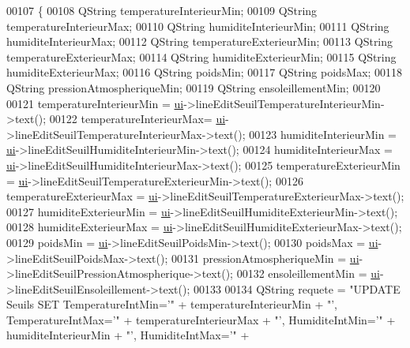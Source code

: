 \begin{DoxyCode}
00107 \{
00108     QString temperatureInterieurMin;
00109     QString temperatureInterieurMax;
00110     QString humiditeInterieurMin;
00111     QString humiditeInterieurMax;
00112     QString temperatureExterieurMin;
00113     QString temperatureExterieurMax;
00114     QString humiditeExterieurMin;
00115     QString humiditeExterieurMax;
00116     QString poidsMin;
00117     QString poidsMax;
00118     QString pressionAtmospheriqueMin;
00119     QString ensoleillementMin;
00120 
00121     temperatureInterieurMin = \hyperlink{class_reglages_alertes_ihm_af3a1fcc84fb1c76248b330372947b245}{ui}->lineEditSeuilTemperatureInterieurMin->text();
00122     temperatureInterieurMax= \hyperlink{class_reglages_alertes_ihm_af3a1fcc84fb1c76248b330372947b245}{ui}->lineEditSeuilTemperatureInterieurMax->text();
00123     humiditeInterieurMin = \hyperlink{class_reglages_alertes_ihm_af3a1fcc84fb1c76248b330372947b245}{ui}->lineEditSeuilHumiditeInterieurMin->text();
00124     humiditeInterieurMax = \hyperlink{class_reglages_alertes_ihm_af3a1fcc84fb1c76248b330372947b245}{ui}->lineEditSeuilHumiditeInterieurMax->text();
00125     temperatureExterieurMin = \hyperlink{class_reglages_alertes_ihm_af3a1fcc84fb1c76248b330372947b245}{ui}->lineEditSeuilTemperatureExterieurMin->text();
00126     temperatureExterieurMax = \hyperlink{class_reglages_alertes_ihm_af3a1fcc84fb1c76248b330372947b245}{ui}->lineEditSeuilTemperatureExterieurMax->text();
00127     humiditeExterieurMin = \hyperlink{class_reglages_alertes_ihm_af3a1fcc84fb1c76248b330372947b245}{ui}->lineEditSeuilHumiditeExterieurMin->text();
00128     humiditeExterieurMax = \hyperlink{class_reglages_alertes_ihm_af3a1fcc84fb1c76248b330372947b245}{ui}->lineEditSeuilHumiditeExterieurMax->text();
00129     poidsMin = \hyperlink{class_reglages_alertes_ihm_af3a1fcc84fb1c76248b330372947b245}{ui}->lineEditSeuilPoidsMin->text();
00130     poidsMax = \hyperlink{class_reglages_alertes_ihm_af3a1fcc84fb1c76248b330372947b245}{ui}->lineEditSeuilPoidsMax->text();
00131     pressionAtmospheriqueMin = \hyperlink{class_reglages_alertes_ihm_af3a1fcc84fb1c76248b330372947b245}{ui}->lineEditSeuilPressionAtmospherique->text();
00132     ensoleillementMin = \hyperlink{class_reglages_alertes_ihm_af3a1fcc84fb1c76248b330372947b245}{ui}->lineEditSeuilEnsoleillement->text();
00133 
00134     QString requete = \textcolor{stringliteral}{"UPDATE Seuils SET TemperatureIntMin='"} + temperatureInterieurMin + \textcolor{stringliteral}{"',
       TemperatureIntMax='"} + temperatureInterieurMax + \textcolor{stringliteral}{"', HumiditeIntMin='"} + humiditeInterieurMin + \textcolor{stringliteral}{"', HumiditeIntMax='"} + 

\end{DoxyCode}
